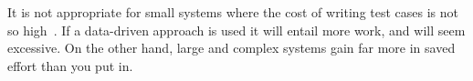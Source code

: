 It is not appropriate for small systems where the cost of writing test cases is
not so high~\cite{Fewster99}. If a data-driven approach is used it will entail
more work, and will seem excessive. On the other hand, large and complex systems
gain far more in saved effort than you put in.\\[1mm]

